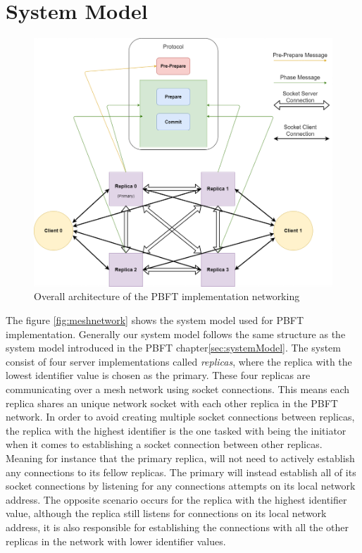 \section{System Model}
\begin{figure}
	\centering
	\includegraphics[width=\linewidth]{figures/meshnetwork}
	\caption{Overall architecture of the PBFT implementation networking}
	\label{fig:meshnetwork}
\end{figure}
The figure \autoref{fig:meshnetwork} shows the system model used for PBFT implementation. Generally our system model follows the same structure as the system model introduced in the PBFT chapter\autoref{sec:systemModel}. The system consist of four server implementations called \emph{replicas}, where the replica with the lowest identifier value is chosen as the primary. These four replicas are communicating over a mesh network using socket connections. This means each replica shares an unique network socket with each other replica in the PBFT network. In order to avoid creating multiple socket connections between replicas, the replica with the highest identifier is the one tasked with being the initiator when it comes to establishing a socket connection between other replicas. Meaning for instance that the primary replica, will not need to actively establish any connections to its fellow replicas. The primary will instead establish all of its socket connections by listening for any connections attempts on its local network address. The opposite scenario occurs for the replica with the highest identifier value, although the replica still listens for connections on its local network address, it is also responsible for establishing the connections with all the other replicas in the network with lower identifier values.


